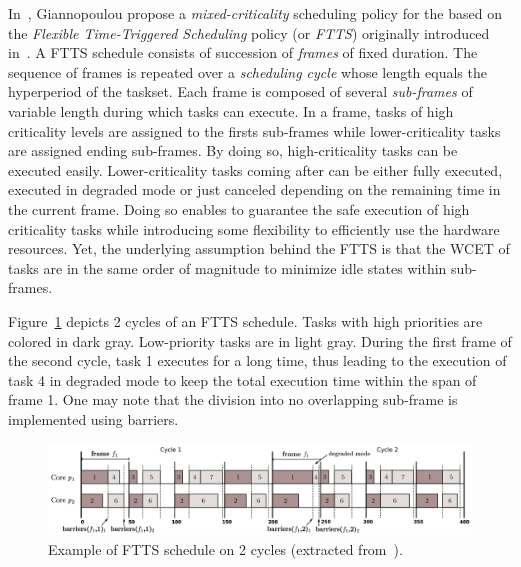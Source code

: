 \documentclass[main.tex]{subfiles}
\begin{document}
In~\cite{Giannopoulou2015}, Giannopoulou \etal propose a
\emph{mixed-criticality} scheduling policy for the \mppalong based on the
\emph{Flexible Time-Triggered Scheduling} policy (or \emph{FTTS}) originally
introduced in~\cite{Giannopoulou2013_EMSOFT}. A FTTS schedule consists of
succession of \emph{frames} of fixed duration. The sequence of frames is
repeated over a \emph{scheduling cycle} whose length equals the hyperperiod of
the taskset. Each frame is composed of several \emph{sub-frames} of variable
length during which tasks can execute. In a frame, tasks of high criticality
levels are assigned to the firsts sub-frames while lower-criticality tasks are
assigned ending sub-frames. By doing so, high-criticality tasks can be executed
easily. Lower-criticality tasks coming after can be either fully executed,
executed in degraded mode or just canceled depending on the remaining time in
the current frame. Doing so enables to guarantee the safe execution of high
criticality tasks while introducing some flexibility to efficiently use the
hardware resources. Yet, the underlying assumption behind the FTTS is that the
WCET of tasks are in the same order of magnitude to minimize idle states within
sub-frames.

\begin{example}
    Figure~\ref{fig_stateOfTheArt_2_FTTS} depicts 2 cycles of an FTTS schedule.
    Tasks with high priorities are colored in dark gray. Low-priority tasks are
    in light gray. During the first frame of the second cycle, task 1 executes
    for a long time, thus leading to the execution of task 4 in degraded mode
    to keep the total execution time within the span of frame 1. One may note
    that the division into no overlapping sub-frame is implemented using
    barriers.

\begin{figure}
    \centering
    \includegraphics[width=15cm]{imgs/png/stateOfTheArt_2_FTTS.png}
    \caption{Example of FTTS schedule on 2 cycles (extracted
    from~\cite{Giannopoulou2015}).}
    \label{fig_stateOfTheArt_2_FTTS}
\end{figure}
\end{example}
\end{document}

